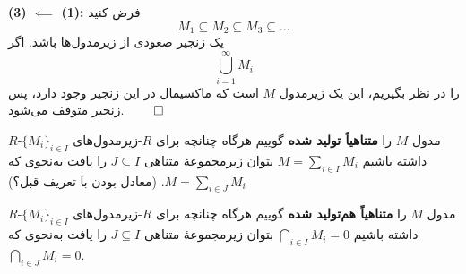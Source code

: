 \begin{frame}
    \textbf{(3) \(\impliedby\) (1):}
    فرض کنید
    \[
        M_1 \subseteq M_2 \subseteq M_3 \subseteq \dots
    \]
    یک زنجیر صعودی از زیرمدول‌ها باشد.
    اگر
    \[
        \bigcup_{i=1}^\infty M_i
    \]
    را در نظر بگیریم، این یک زیرمدول $M$ است که ماکسیمال در این زنجیر وجود دارد، پس زنجیر متوقف می‌شود.
    \hfill\(\qed\)

\end{frame}

\begin{frame}
    \begin{definition}
        $R$-مدول $M$ را \textbf{ متناهیاً تولید شده} گوییم هرگاه
        چنانچه برای
        \(R\)-زیرمدول‌های
        \(\{M_i\}_{i\in I}\)
        داشته باشیم
        \(M = \sum_{i\in I} M_i\)
        بتوان زیرمجموعه‌ٔ متناهی
        \(J \subseteq I\)
        را یافت به‌نحوی که
        \(M = \sum_{i\in J} M_i\).
        (معادل بودن با تعریف قبل؟)

    \end{definition}
    \begin{definition}
        $R$-مدول $M$ را \textbf{ متناهیاً هم‌تولید شده} گوییم هرگاه
        چنانچه برای
        \(R\)-زیرمدول‌های
        \(\{M_i\}_{i\in I}\)
        داشته باشیم
        \( \bigcap_{i\in I} M_i = 0\)
        بتوان زیرمجموعه‌ٔ متناهی
        \(J \subseteq I\)
        را یافت به‌نحوی که
        \( \bigcap_{i\in J} M_i = 0\).

    \end{definition}
\end{frame}
